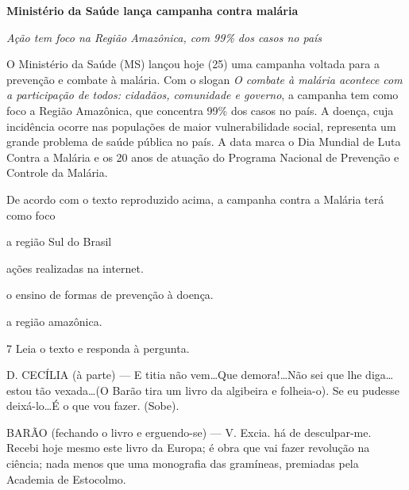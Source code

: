 \begin{myquote}
\textbf{Ministério da Saúde lança campanha contra malária}

\textit{Ação tem foco na Região Amazônica, com 99\% dos casos no país}

O Ministério da Saúde (MS) lançou hoje (25) uma campanha voltada para a
prevenção e combate à malária. Com o slogan \textit{O combate à malária acontece
com a participação de todos: cidadãos, comunidade e governo}, a campanha
tem como foco a Região Amazônica, que concentra 99\% dos casos no país. A
doença, cuja incidência ocorre nas populações de maior vulnerabilidade
social, representa um grande problema de saúde pública no país. A data
marca o Dia Mundial de Luta Contra a Malária e os 20 anos de atuação do
Programa Nacional de Prevenção e Controle da Malária.

\end{myquote}

De acordo com o texto reproduzido acima, a campanha contra a Malária
terá como foco

\begin{escolha}
  \item a região Sul do Brasil

  \item ações realizadas na internet.

  \item o ensino de formas de prevenção à doença.

  \item a região amazônica.
\end{escolha}

\num{7} Leia o texto e responda à pergunta.

\begin{myquote}
D. CECÍLIA (à parte) --- E titia não vem\ldots Que demora!\ldots Não sei
que lhe diga\ldots estou tão vexada\ldots (O Barão tira um livro da algibeira
e folheia-o). Se eu pudesse deixá-lo\ldots É o que vou fazer. (Sobe).

BARÃO (fechando o livro e erguendo-se) --- V. Excia. há de desculpar-me.
Recebi hoje mesmo este livro da Europa; é obra que vai fazer revolução na
ciência; nada menos que uma monografia das gramíneas, premiadas pela 
Academia de Estocolmo.

\end{myquote}


